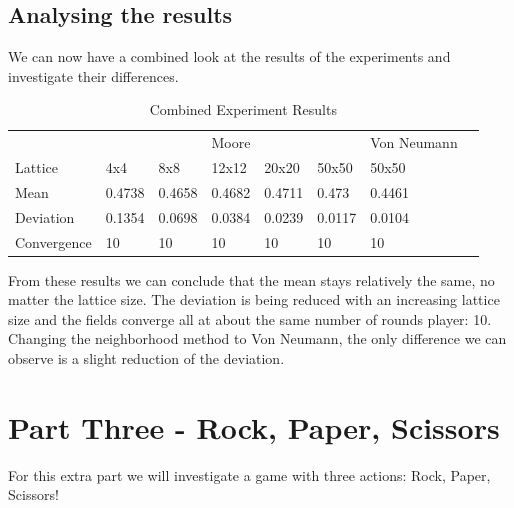 \documentclass[a4paper, 11pt]{article}
\begin{document}
\newpage
\subsection{Analysing the results}

We can now have a combined look at the results of the experiments and investigate their differences.



\begin{table}[]
\centering
\caption{Combined Experiment Results}
\begin{tabular}{l|l|l|l|l|l|l|l}
            & \multicolumn{5}{c|}{Moore}                 & Von Neumann &  \\ \cline{1-7}
Lattice     & 4x4    & 8x8    & 12x12  & 20x20  & 50x50  & 50x50       &  \\ \cline{1-7}
Mean        & 0.4738 & 0.4658 & 0.4682 & 0.4711 & 0.473  & 0.4461      &  \\ \cline{1-7}
Deviation   & 0.1354 & 0.0698 & 0.0384 & 0.0239 & 0.0117 & 0.0104      &  \\ \cline{1-7}
Convergence & 10     & 10     & 10     & 10     & 10     & 10          &  \\ \cline{1-7}
\end{tabular}
\end{table}


From these results we can conclude that the mean stays relatively the same, no matter the lattice size. The deviation is being reduced with an increasing lattice size and the fields converge all at about the same number of rounds player: 10. Changing the neighborhood method to Von Neumann, the only difference we can observe is a slight reduction of the deviation.

\hrulefill


\section{Part Three - Rock, Paper, Scissors}

For this extra part we will investigate a game with three actions: Rock, Paper, Scissors!
\end{document}
